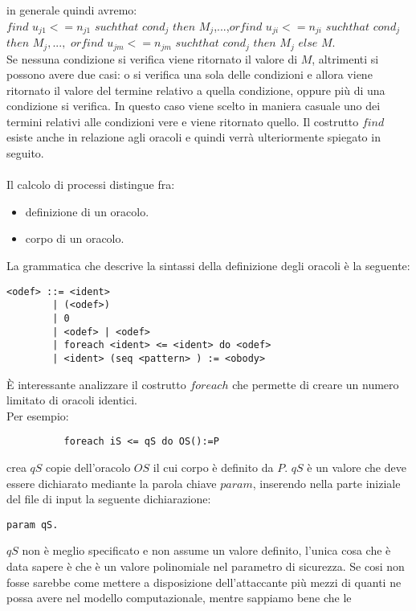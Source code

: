 \documentclass[a4paper,openright,twoside,12pt]{report}
\begin{document}
in generale quindi avremo:\\
$find$ $u_{j1}<=n_{j1}$ $suchthat$ $cond_j$ $then$ $M_j$,...,$orfind$ $u_{ji}<=n_{ji}$ $suchthat$ $cond_j$ $then$ $M_j,...,$ $orfind$ $u_{jm}<=n_{jm}$ $suchthat$ $cond_j$ $then$ $M_j$ $else$ $M$.
\\Se nessuna condizione si verifica viene ritornato il valore di $M$, altrimenti si possono avere due casi: o si verifica una sola delle condizioni e allora viene ritornato il valore del termine
relativo a quella condizione, oppure pi\`u di una condizione si verifica. In questo caso viene scelto in maniera casuale uno dei termini relativi alle condizioni vere e viene ritornato quello. 
Il costrutto $find$ esiste anche in relazione agli oracoli e quindi verr\`a ulteriormente spiegato in seguito.
\\
\\
Il calcolo di processi distingue fra:
\begin{itemize}
 \item definizione di un oracolo.
 \item corpo di un oracolo.
\end{itemize}
La grammatica che descrive la sintassi della definizione degli oracoli \`e la seguente:
\begin{verbatim}
<odef> ::= <ident>
        | (<odef>)
        | 0
        | <odef> | <odef>
        | foreach <ident> <= <ident> do <odef>
        | <ident> (seq <pattern> ) := <obody>
\end{verbatim} 
\`E interessante analizzare il costrutto $foreach$ che permette di creare un numero limitato di oracoli identici. \\
Per esempio: \begin{center}
		\begin{verbatim}
		  foreach iS <= qS do OS():=P
		\end{verbatim}
	      \end{center}
crea $qS$ copie dell'oracolo $OS$ il cui corpo \`e definito da $P$. $qS$ \`e un valore che deve essere dichiarato mediante la parola chiave $param$, 
inserendo nella parte iniziale del file di input la seguente dichiarazione:
\begin{verbatim}
param qS. 
\end{verbatim}
$qS$ non \`e meglio specificato e non assume un valore definito, l'unica cosa che \`e data sapere \`e che \`e un valore polinomiale nel parametro di sicurezza.
Se cosi non fosse sarebbe come mettere a disposizione dell'attaccante pi\`u mezzi di quanti ne possa avere nel modello computazionale, mentre sappiamo bene che le
\end{document}
